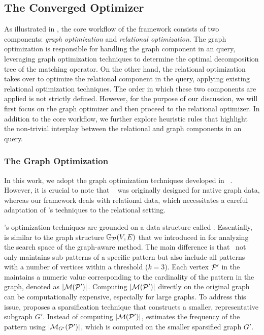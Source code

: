 \subsection{The Converged Optimizer}
\label{sec:converged}
As illustrated in , the core workflow of the \name framework consists of two components: \emph{graph optimization} and \emph{relational optimization}. The graph optimization is responsible for handling the graph component in an \spjm query, leveraging graph optimization techniques to determine the optimal decomposition tree of the matching operator. On the other hand, the relational optimization takes over to optimize the relational component in the query, applying existing relational optimization techniques.
The order in which these two components are applied is not strictly defined. However, for the purpose of our discussion, we will first focus on the graph optimizer and then proceed to the relational optimizer.
In addition to the core workflow, we further explore heuristic rules that highlight the non-trivial interplay between the relational and graph components in an \spjm query.



\subsubsection{The Graph Optimization}
\label{sec:graph-optimizer}
In this work, we adopt the graph optimization techniques developed in \glogs~\cite{GLogS}. However, it is crucial to note that \glogs~ was originally designed for native graph data, whereas our framework deals with relational data, which necessitates a careful adaptation of \glogs's techniques to the relational setting.

 \glogs's optimization techniques are grounded on a data structure called \glogue. Essentially, \glogue~ is similar to the graph structure $\mathbb{G}_{\mathcal{P}}(V, E)$ that we introduced in  for analyzing the search space of the graph-aware method. The main difference is that \glogue~not only maintains sub-patterns of a specific pattern but also include all patterns with a number of vertices within a threshold ($k=3$). Each vertex $\mathcal{P}'$ in the \glogue~ maintains a numeric value corresponding to the cardinality of the pattern in the graph, denoted as $|\mathcal{M}(\mathcal{P}')|$. Computing $|\mathcal{M}(\mathcal{P}')|$ directly on the original graph can be computationally expensive, especially for large graphs. To address this issue, \glogs proposes a sparsification technique that constructs a smaller, representative subgraph $G'$. Instead of computing $|\mathcal{M}(\mathcal{P}')|$, \glogs estimates the frequency of the pattern using $|\mathcal{M}_{G'}(\mathcal{P}')|$, which is computed on the smaller sparsified graph $G'$.

